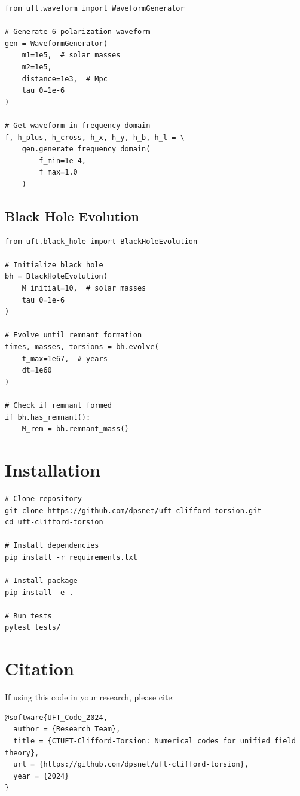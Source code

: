 \begin{verbatim}
from uft.waveform import WaveformGenerator

# Generate 6-polarization waveform
gen = WaveformGenerator(
    m1=1e5,  # solar masses
    m2=1e5,
    distance=1e3,  # Mpc
    tau_0=1e-6
)

# Get waveform in frequency domain
f, h_plus, h_cross, h_x, h_y, h_b, h_l = \
    gen.generate_frequency_domain(
        f_min=1e-4,
        f_max=1.0
    )
\end{verbatim}

\subsection{Black Hole Evolution}

\begin{verbatim}
from uft.black_hole import BlackHoleEvolution

# Initialize black hole
bh = BlackHoleEvolution(
    M_initial=10,  # solar masses
    tau_0=1e-6
)

# Evolve until remnant formation
times, masses, torsions = bh.evolve(
    t_max=1e67,  # years
    dt=1e60
)

# Check if remnant formed
if bh.has_remnant():
    M_rem = bh.remnant_mass()
\end{verbatim}

\section{Installation}

\begin{verbatim}
# Clone repository
git clone https://github.com/dpsnet/uft-clifford-torsion.git
cd uft-clifford-torsion

# Install dependencies
pip install -r requirements.txt

# Install package
pip install -e .

# Run tests
pytest tests/
\end{verbatim}

\section{Citation}

If using this code in your research, please cite:

\begin{verbatim}
@software{UFT_Code_2024,
  author = {Research Team},
  title = {CTUFT-Clifford-Torsion: Numerical codes for unified field theory},
  url = {https://github.com/dpsnet/uft-clifford-torsion},
  year = {2024}
}
\end{verbatim}

